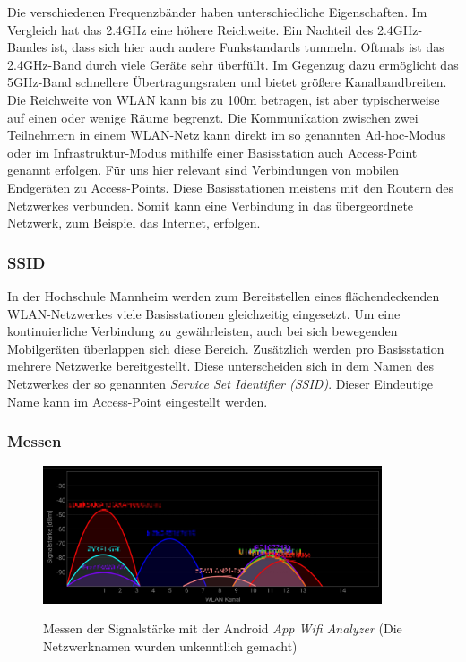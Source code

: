 \documentclass{scrartcl}%
\begin{document}
Die verschiedenen Frequenzbänder haben unterschiedliche Eigenschaften. Im Vergleich hat das 2.4GHz eine höhere Reichweite. Ein Nachteil des 2.4GHz-Bandes ist, dass sich hier auch andere Funkstandards tummeln. Oftmals ist das 2.4GHz-Band durch viele Geräte sehr überfüllt. Im Gegenzug dazu ermöglicht das 5GHz-Band schnellere Übertragungsraten und bietet größere Kanalbandbreiten. Die Reichweite von WLAN kann bis zu 100m betragen, ist aber typischerweise auf einen oder wenige Räume begrenzt. 
Die Kommunikation zwischen zwei Teilnehmern in einem WLAN-Netz kann direkt im so genannten Ad-hoc-Modus oder im Infrastruktur-Modus mithilfe einer Basisstation auch Access-Point genannt erfolgen. Für uns hier relevant sind Verbindungen von mobilen Endgeräten zu Access-Points. Diese Basisstationen meistens mit den Routern des Netzwerkes verbunden. Somit kann eine Verbindung in das übergeordnete Netzwerk, zum Beispiel das Internet, erfolgen.

\subsubsection{SSID}
In der Hochschule Mannheim werden zum Bereitstellen eines flächendeckenden WLAN-Netzwerkes viele Basisstationen gleichzeitig eingesetzt. Um eine kontinuierliche Verbindung zu gewährleisten, auch bei sich bewegenden Mobilgeräten überlappen sich diese Bereich. 
Zusätzlich werden pro Basisstation mehrere Netzwerke bereitgestellt. Diese unterscheiden sich in dem Namen des Netzwerkes der so genannten \textit{Service Set Identifier (SSID)}. Dieser Eindeutige Name kann im Access-Point eingestellt werden. 

\subsubsection{Messen}

\begin{figure}[h]
	\centering
	\caption{Messen der Signalstärke mit der Android \textit{App Wifi Analyzer} (Die Netzwerknamen wurden unkenntlich gemacht)}
	\includegraphics[width=10cm]{bilder/wifianalyzer}
	\newline
	\label{wifiAnalyzer}
\end{figure}
\end{document}
